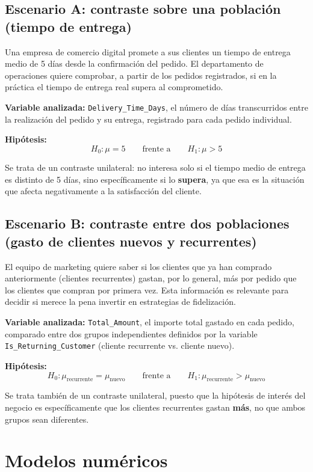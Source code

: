 \documentclass[11pt, a4paper]{article}
\begin{document}
\subsection{Escenario A: contraste sobre una población (tiempo de entrega)}

Una empresa de comercio digital promete a sus clientes un tiempo de entrega medio de 5 
días desde la confirmación del pedido. El departamento de operaciones quiere comprobar, a 
partir de los pedidos registrados, si en la práctica el tiempo de entrega real supera al 
comprometido.

\textbf{Variable analizada:} \texttt{Delivery\_Time\_Days}, el número de días transcurridos 
entre la realización del pedido y su entrega, registrado para cada pedido individual.

\textbf{Hipótesis:}
\[
H_0: \mu = 5 \qquad \text{frente a} \qquad H_1: \mu > 5
\]

Se trata de un contraste unilateral: no interesa solo si el tiempo medio de entrega es 
distinto de 5 días, sino específicamente si lo \textbf{supera}, ya que esa es la situación 
que afecta negativamente a la satisfacción del cliente.

\subsection{Escenario B: contraste entre dos poblaciones (gasto de clientes nuevos y recurrentes)}

El equipo de marketing quiere saber si los clientes que ya han comprado anteriormente 
(clientes recurrentes) gastan, por lo general, más por pedido que los clientes que compran 
por primera vez. Esta información es relevante para decidir si merece la pena invertir en 
estrategias de fidelización.

\textbf{Variable analizada:} \texttt{Total\_Amount}, el importe total gastado en cada pedido, 
comparado entre dos grupos independientes definidos por la variable 
\texttt{Is\_Returning\_Customer} (cliente recurrente vs. cliente nuevo).

\textbf{Hipótesis:}
\[
H_0: \mu_{\text{recurrente}} = \mu_{\text{nuevo}} \qquad \text{frente a} \qquad H_1: \mu_{\text{recurrente}} > \mu_{\text{nuevo}}
\]

Se trata también de un contraste unilateral, puesto que la hipótesis de interés del negocio 
es específicamente que los clientes recurrentes gastan \textbf{más}, no que ambos grupos 
sean diferentes.

\section{Modelos numéricos}
\end{document}
